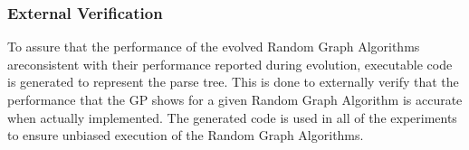 \documentclass{article}
\begin{document}
\subsubsection{External Verification}
To assure that the performance of the evolved Random Graph Algorithms areconsistent with their performance reported during evolution,
executable code is generated to represent the parse tree. This is done to externally verify that the performance that the GP shows for a
given Random Graph Algorithm is accurate when actually implemented. The generated code is used in all of the experiments to ensure unbiased execution 
of the Random Graph Algorithms.








 
\end{document}
